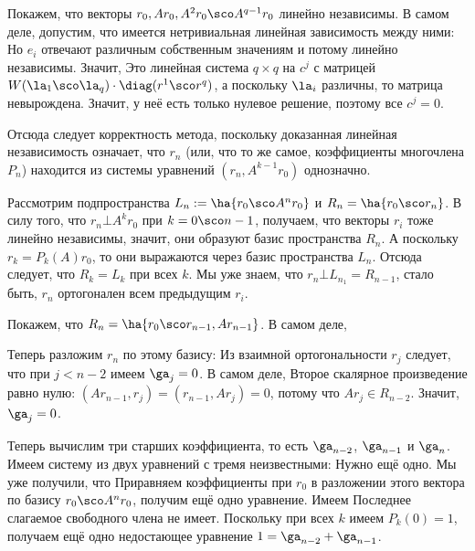 \documentclass[a4paper]{article}
\begin{document}
Покажем, что векторы $r_0, Ar_0, A^2r_0\sco A^{q-1} r_0$ линейно независимы. В самом деле,
допустим, что имеется нетривиальная линейная зависимость между ними:
Но $e_i$ отвечают различным собственным значениям и потому линейно независимы. Значит,
Это линейная система $q\times q$ на $c^j$ с матрицей $W(\la_1\sco \la_q)\cdot \diag(r^1\sco r^q)$,
а поскольку $\la_i$ различны, то матрица невырождена. Значит, у неё есть только нулевое решение,
поэтому все $c^j = 0$.

Отсюда следует корректность метода, поскольку доказанная линейная независимость означает,
что $r_n$ (или, что то же самое, коэффициенты многочлена $P_n$)
находится из системы уравнений $(r_n,A^{k-1} r_0)$ однозначно.

Рассмотрим подпространства $L_n := \ha{r_0\sco A^n r_0}$ и $R_n = \ha{r_0\sco r_n}$.
В силу того, что $r_n \bot A^k r_0$ при $k = 0\sco n-1$,
получаем, что векторы $r_i$ тоже линейно независимы, значит, они образуют базис пространства $R_n$.
А поскольку $r_k  = P_k(A) r_0$, то они выражаются через базис пространства $L_n$.
Отсюда следует, что $R_k = L_k$ при всех $k$. Мы уже знаем, что $r_n \bot L_{n_1} = R_{n-1}$,
стало быть, $r_n$ ортогонален всем предыдущим $r_i$.

Покажем, что $R_n = \ha{r_0\sco r_{n-1}, A r_{n-1}}$. В самом деле,

Теперь разложим $r_n$ по этому базису:
Из взаимной ортогональности $r_j$ следует, что при $j < n-2$ имеем $\ga_j =0$.
В самом деле,
Второе скалярное произведение равно нулю: $(A r_{n-1}, r_j) = (r_{n-1}, A r_j) = 0$,
потому что $A r_j \in R_{n-2}$. Значит, $\ga_j = 0$.

Теперь вычислим три старших коэффициента, то есть $\ga_{n-2}$, $\ga_{n-1}$ и $\ga_n$.
Имеем систему из двух уравнений с тремя неизвестными:
Нужно ещё одно. Мы уже получили, что
Приравняем коэффициенты при $r_0$ в разложении этого вектора по базису $r_0\sco A^n r_0$,
получим ещё одно уравнение. Имеем
Последнее слагаемое свободного члена не имеет. Поскольку при всех $k$ имеем $P_k(0) = 1$,
получаем ещё одно недостающее уравнение $1 = \ga_{n-2} + \ga_{n-1}$.
\end{document}
